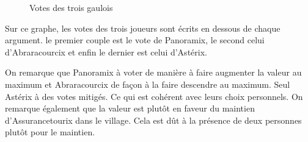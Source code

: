 \documentclass[11pt]{article}
\theoremstyle{defi}
\theoremstyle{not}
\theoremstyle{prob}
\begin{document}
\begin{figure}
      \caption{Votes des trois gaulois}
      \label{fig:votes_gaulois}
    \end{figure}

    Sur ce graphe, les votes des trois joueurs sont écrits en dessous de chaque argument. le premier couple est le vote de Panoramix, le second celui d'Abraracourcix et enfin le dernier est celui d'Astérix.

    On remarque que Panoramix à voter de manière à faire augmenter la valeur au maximum et Abraracourcix de façon à la faire descendre au maximum. Seul Astérix à des votes mitigés. Ce qui est cohérent avec leurs choix personnels.
    On remarque également que la valeur est plutôt en faveur du maintien d'Assurancetourix dans le village. Cela est dût à la présence de deux personnes plutôt pour le maintien.\newpage




  \appendix
\end{document}
